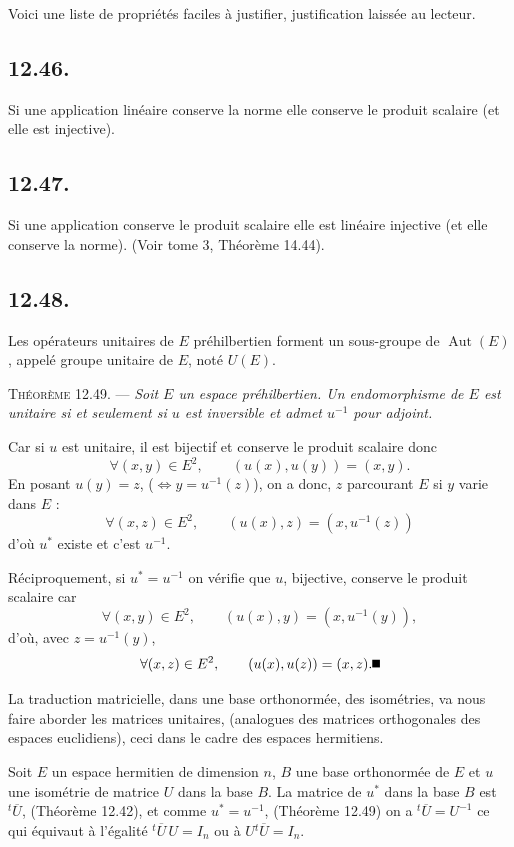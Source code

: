 Voici une liste de propriétés faciles à justifier, justification laissée au lecteur.

\subsection*{12.46.}
Si une application linéaire conserve la norme elle conserve le produit scalaire (et elle est injective).

\subsection*{12.47.}
Si une application conserve le produit scalaire elle est linéaire injective (et elle conserve la norme). (Voir tome 3, Théorème 14.44).

\subsection*{12.48.}
Les opérateurs unitaires de $E$ préhilbertien forment un sous-groupe de $\operatorname{Aut}(E)$, appelé groupe unitaire de $E$, noté $U(E)$.

\medskip\noindent\textsc{Théorème 12.49.} --- \emph{Soit $E$ un espace préhilbertien. Un endomorphisme de $E$ est unitaire si et seulement si $u$ est inversible et admet $u^{-1}$ pour adjoint.}

Car si $u$ est unitaire, il est bijectif et conserve le produit scalaire donc
\[
\forall(x,y)\in E^2,\qquad (u(x),u(y))=(x,y).
\]
En posant $u(y)=z$, ($\Longleftrightarrow y=u^{-1}(z)$), on a donc, $z$ parcourant $E$ si $y$ varie dans $E$ :
\[
\forall(x,z)\in E^2,\qquad (u(x),z)=(x,u^{-1}(z))
\]
d'où $u^*$ existe et c'est $u^{-1}$.

Réciproquement, si $u^*=u^{-1}$ on vérifie que $u$, bijective, conserve le produit scalaire car
\[
\forall(x,y)\in E^2,\qquad (u(x),y)=(x,u^{-1}(y)),
\]
d'où, avec $z=u^{-1}(y)$,
\[
\forall(x,z)\in E^2,\qquad (u(x),u(z))=(x,z). \bookend
\]

La traduction matricielle, dans une base orthonormée, des isométries, va nous faire aborder les matrices unitaires, (analogues des matrices orthogonales des espaces euclidiens), ceci dans le cadre des espaces hermitiens.

Soit $E$ un espace hermitien de dimension $n$, $B$ une base orthonormée de $E$ et $u$ une isométrie de matrice $U$ dans la base $B$. La matrice de $u^*$ dans la base $B$ est ${}^t\!\overline U$, (Théorème 12.42), et comme $u^*=u^{-1}$, (Théorème 12.49) on a ${}^t\!\overline U=U^{-1}$ ce qui équivaut à l'égalité ${}^t\!\overline U\,U=I_n$ ou à $U{}^t\!\overline U=I_n$.

